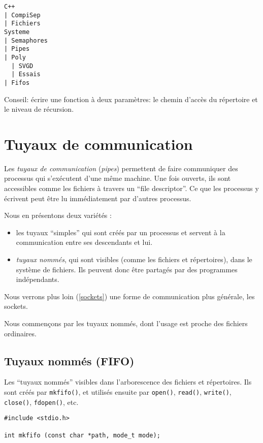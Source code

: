 \extrait
\begin{lstlisting}
C++
| CompiSep
| Fichiers
Systeme
| Semaphores
| Pipes
| Poly
  | SVGD
  | Essais
| Fifos
\end{lstlisting}

Conseil: écrire une fonction à deux paramètres: le chemin d'accès du 
répertoire et le niveau de récursion.


\section{Tuyaux de communication }

 Les \emph{tuyaux de communication} (\emph{pipes})
permettent de faire communiquer des processus qui s'exécutent d'une
même machine. Une fois ouverts, ils sont accessibles comme les fichiers
à travers un ``file descriptor''. Ce que les processus y écrivent peut
être lu immédiatement par d'autres processus.

Nous en présentons deux variétés :

\begin{itemize}
\item les tuyaux ``simples'' qui sont créés par un processus
  et servent à  la communication entre ses descendants et lui.
\item \emph{tuyaux nommés},
  qui sont visibles (comme les fichiers et répertoires),
  dans le système de fichiers. Ils  peuvent donc être partagés
par des programmes indépendants.
\end{itemize}

Nous verrons plus loin (\ref{sockets}) une forme de communication plus
générale, les sockets.


Nous commençons par les tuyaux nommés, dont l'usage est proche des fichiers
ordinaires.
  

\subsection{Tuyaux nommés (FIFO)}


Les ``tuyaux nommés'' visibles dans l'arborescence des fichiers et
répertoires. Ils sont créés par \texttt{mkfifo()}, et utilisés ensuite
par
\texttt{open()},
\texttt{read()},
\texttt{write()},
\texttt{close()},
\texttt{fdopen()}, etc.



\extrait
\begin{lstlisting}
#include <stdio.h>

int mkfifo (const char *path, mode_t mode);
\end{lstlisting}


